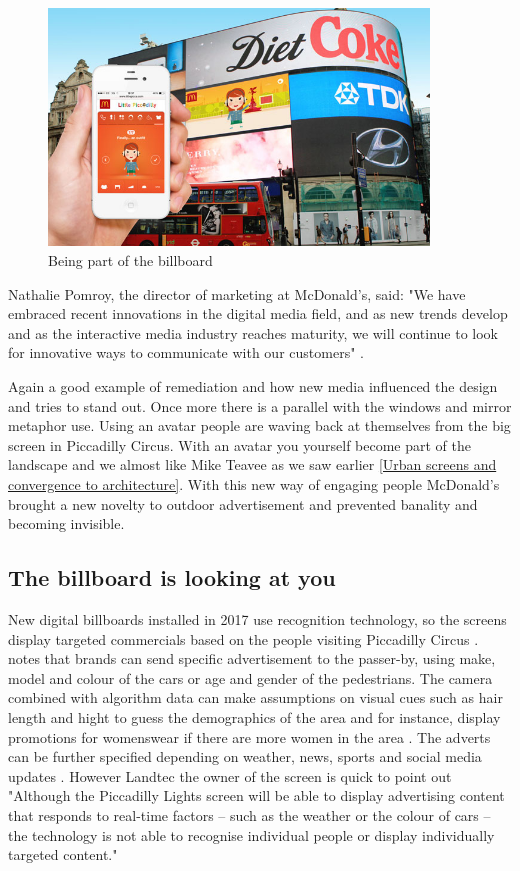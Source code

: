 \documentclass[a4paper, 11pt]{article}
\begin{document}
\begin{figure}[h!]
    \centering
    \includegraphics[width=0.9\textwidth]{avatar.png}
    \caption{Being part of the billboard \citep{campaign2014}}
    \label{fig:graph2}
\end{figure}

Nathalie Pomroy, the director of marketing at McDonald’s, said: "We have embraced recent innovations in the digital media field, and as new trends develop and as the interactive media industry reaches maturity, we will continue to look for innovative ways to communicate with our customers" \citep{campaign2014}.

Again a good example of remediation and how new media influenced the design and tries to stand out. Once more there is a parallel with the windows and mirror metaphor \cite{bolter2003} use. Using an avatar people are waving back at themselves from the big screen in Piccadilly Circus. With an avatar you yourself become part of the landscape and we almost like Mike Teavee as we saw earlier \ref{Urban screens and convergence to architecture}. With this new way of engaging people McDonald's brought a new novelty to outdoor advertisement and prevented banality and becoming invisible. 

\subsection {The billboard is looking at you}


New digital billboards installed in 2017 use recognition technology, so the screens display targeted commercials based on the people visiting Piccadilly Circus \citep{Dezeen}. \cite{Dezeen} notes that brands can send specific advertisement to the passer-by, using make, model and colour of the cars or age and gender of the pedestrians. The camera combined with algorithm data can make assumptions on visual cues such as hair length and hight to guess the demographics of the area and for instance, display promotions for womenswear if there are more women in the area \citep{Dezeen}. The adverts can be further specified depending on weather, news, sports and social media updates \citep{Dezeen}. However Landtec the owner of the screen is quick to point out "Although the Piccadilly Lights screen will be able to display advertising content that responds to real-time factors – such as the weather or the colour of cars – the technology is not able to recognise individual people or display individually targeted content."
\end{document}
